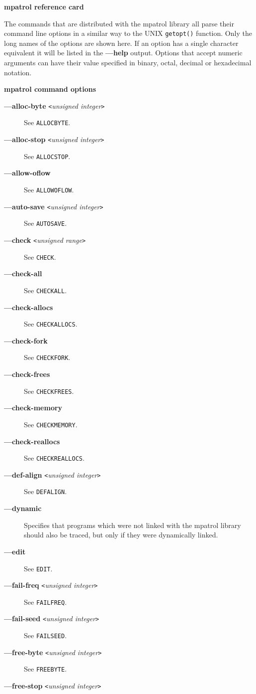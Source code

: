 \documentclass[a4paper,landscape,final]{article}
\newcommand{\heading}[1]{\textbf{\normalsize #1}}
\newcommand{\function}[1]{\texttt{#1()}}
\newcommand{\flag}[1]{\textbf{---#1}}
\newcommand{\flagpar}[2]{\flag{#1} \texttt{<}\textit{#2}\texttt{>}}
\newcommand{\option}[1]{\texttt{#1}}
\begin{document}
\begin{multicols}{3}{\textbf{\Large mpatrol reference card}}
\vskip 12pt

The commands that are distributed with the mpatrol library all parse their
command line options in a similar way to the UNIX \function{getopt} function.
Only the long names of the options are shown here.  If an option has a single
character equivalent it will be listed in the \flag{help} output.  Options that
accept numeric arguments can have their value specified in binary, octal,
decimal or hexadecimal notation.

\vskip 12pt
\heading{mpatrol command options}
\vskip 6pt

\begin{description}
\item[\flagpar{alloc-byte}{unsigned integer}]
\hfill See \option{ALLOCBYTE}.
\item[\flagpar{alloc-stop}{unsigned integer}]
\hfill See \option{ALLOCSTOP}.
\item[\flag{allow-oflow}]
\hfill See \option{ALLOWOFLOW}.
\item[\flagpar{auto-save}{unsigned integer}]
\hfill See \option{AUTOSAVE}.
\item[\flagpar{check}{unsigned range}]
\hfill See \option{CHECK}.
\item[\flag{check-all}]
\hfill See \option{CHECKALL}.
\item[\flag{check-allocs}]
\hfill See \option{CHECKALLOCS}.
\item[\flag{check-fork}]
\hfill See \option{CHECKFORK}.
\item[\flag{check-frees}]
\hfill See \option{CHECKFREES}.
\item[\flag{check-memory}]
\hfill See \option{CHECKMEMORY}.
\item[\flag{check-reallocs}]
\hfill See \option{CHECKREALLOCS}.
\item[\flagpar{def-align}{unsigned integer}]
\hfill See \option{DEFALIGN}.
\item[\flag{dynamic}]
Specifies that programs which were not linked with the mpatrol library should
also be traced, but only if they were dynamically linked.
\item[\flag{edit}]
\hfill See \option{EDIT}.
\item[\flagpar{fail-freq}{unsigned integer}]
\hfill See \option{FAILFREQ}.
\item[\flagpar{fail-seed}{unsigned integer}]
\hfill See \option{FAILSEED}.
\item[\flagpar{free-byte}{unsigned integer}]
\hfill See \option{FREEBYTE}.
\item[\flagpar{free-stop}{unsigned integer}]

\end{description}
\end{multicols}
\end{document}
